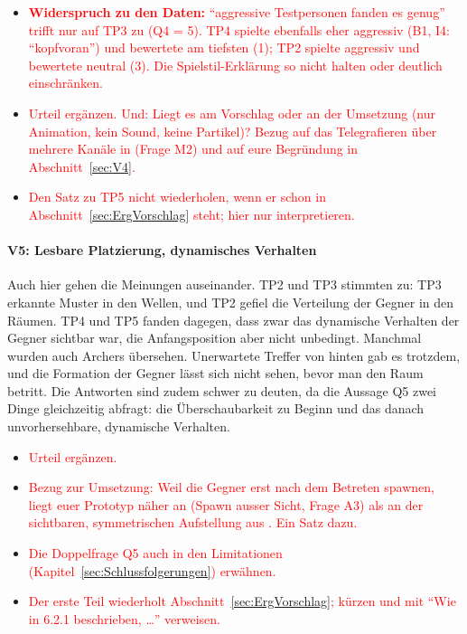 \documentclass[../Main.tex]{subfiles}
\begin{document}
\begin{itemize}[leftmargin=1.5cm]
    \item \textcolor{red}{\textbf{Widerspruch zu den Daten:} \enquote{aggressive Testpersonen fanden es genug} trifft nur auf TP3 zu (Q4 = 5). TP4 spielte ebenfalls eher aggressiv (B1, I4: \enquote{kopfvoran}) und bewertete am tiefsten (1); TP2 spielte aggressiv und bewertete neutral (3). Die Spielstil-Erklärung so nicht halten oder deutlich einschränken.}
    \item \textcolor{red}{Urteil ergänzen. Und: Liegt es am Vorschlag oder an der Umsetzung (nur Animation, kein Sound, keine Partikel)? Bezug auf das Telegrafieren über mehrere Kanäle in  (Frage M2) und auf eure Begründung in Abschnitt~\ref{sec:V4}.}
    \item \textcolor{red}{Den Satz zu TP5 nicht wiederholen, wenn er schon in Abschnitt~\ref{sec:ErgVorschlag} steht; hier nur interpretieren.}
\end{itemize}

\paragraph{V5: Lesbare Platzierung, dynamisches Verhalten}
Auch hier gehen die Meinungen auseinander. TP2 und TP3 stimmten zu: TP3 erkannte Muster in den Wellen, und TP2 gefiel die Verteilung der Gegner in den Räumen. TP4 und TP5 fanden dagegen, dass zwar das dynamische Verhalten der Gegner sichtbar war, die Anfangsposition aber nicht unbedingt. Manchmal wurden auch Archers übersehen. Unerwartete Treffer von hinten gab es trotzdem, und die Formation der Gegner lässt sich nicht sehen, bevor man den Raum betritt. Die Antworten sind zudem schwer zu deuten, da die Aussage Q5 zwei Dinge gleichzeitig abfragt: die Überschaubarkeit zu Beginn und das danach unvorhersehbare, dynamische Verhalten.

\begin{itemize}[leftmargin=1.5cm]
    \item \textcolor{red}{Urteil ergänzen.}
    \item \textcolor{red}{Bezug zur Umsetzung: Weil die Gegner erst nach dem Betreten spawnen, liegt euer Prototyp näher an  (Spawn ausser Sicht, Frage A3) als an der sichtbaren, symmetrischen Aufstellung aus . Ein Satz dazu.}
    \item \textcolor{red}{Die Doppelfrage Q5 auch in den Limitationen (Kapitel~\ref{sec:Schlussfolgerungen}) erwähnen.}
    \item \textcolor{red}{Der erste Teil wiederholt Abschnitt~\ref{sec:ErgVorschlag}; kürzen und mit \enquote{Wie in 6.2.1 beschrieben, \ldots} verweisen.}
\end{itemize}
\end{document}
